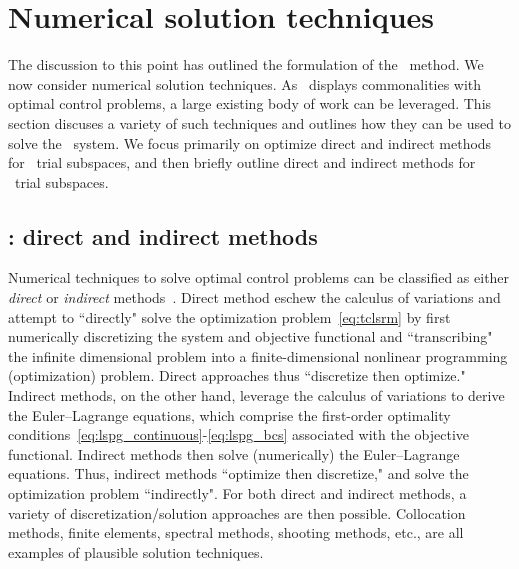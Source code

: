 \section{Numerical solution techniques}\label{sec:numerical_techniques}
The discussion to this point has outlined the formulation of the \methodAcronym\ method. We now consider numerical solution techniques. 
 As \methodAcronym\ displays commonalities with optimal
control problems, a large existing body of work can be leveraged. This section
discuses a variety of such techniques and outlines how they can be used to
solve the \methodAcronym\ system. We focus primarily on 
optimize direct and indirect methods for \spatialAcronym\ trial subspaces, 
and then briefly outline direct and indirect methods for \spaceTimeAcronym\ trial subspaces. 

\subsection{\spatialAcronym: direct and indirect methods}
Numerical techniques to
solve optimal control problems can be classified as either
\textit{direct} or \textit{indirect}
methods~\cite{conway_optimalcontrolreview}.  Direct  method eschew
the calculus of variations 
and attempt to ``directly" solve the optimization problem~\eqref{eq:tclsrm} by first
numerically discretizing the system and objective functional and ``transcribing"
the infinite dimensional problem into a finite-dimensional nonlinear
programming (optimization) problem. Direct approaches thus ``discretize then optimize."
Indirect methods, on the other hand, leverage the calculus of variations to
derive the Euler--Lagrange equations, which comprise the first-order
optimality conditions~\eqref{eq:lspg_continuous}-\eqref{eq:lspg_bcs} associated with the objective 
functional. Indirect methods then solve (numerically) the Euler--Lagrange equations. Thus, indirect methods ``optimize then discretize," and 
solve the optimization problem
``indirectly".  For both direct and indirect methods, a variety of
discretization/solution approaches are then possible. Collocation methods,
finite elements, spectral methods, shooting methods, etc., are all examples of
plausible solution techniques.  

